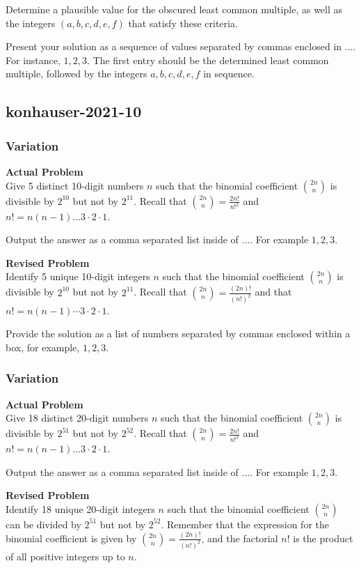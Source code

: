 Determine a plausible value for the obscured least common multiple, as well as the integers $(a, b, c, d, e, f)$ that satisfy these criteria.

Present your solution as a sequence of values separated by commas enclosed in $\boxed{...}$. For instance, $\boxed{1, 2, 3}$. The first entry should be the determined least common multiple, followed by the integers $a, b, c, d, e, f$ in sequence.

\subsection{konhauser-2021-10}
\subsubsection{Variation}
\textbf{Actual Problem}\\
Give 5 distinct 10-digit numbers $n$ such that the binomial coefficient $\binom{2n}{n}$ is divisible by $2^{10}$ but not by $2^{11}$. Recall that $\binom{2n}{n} = \frac{2n!}{n!^2}$ and $n! = n(n-1)...3\cdot 2 \cdot 1$.

Output the answer as a comma separated list inside of $\boxed{...}$. For example $\boxed{1, 2, 3}$.

\textbf{Revised Problem}\\
Identify 5 unique 10-digit integers \( n \) such that the binomial coefficient \(\binom{2n}{n}\) is divisible by \( 2^{10} \) but not by \( 2^{11} \). Recall that \(\binom{2n}{n} = \frac{(2n)!}{(n!)^2}\) and that \( n! = n(n-1)\cdots 3 \cdot 2 \cdot 1\).

Provide the solution as a list of numbers separated by commas enclosed within a box, for example, \(\boxed{1, 2, 3}\).

\subsubsection{Variation}
\textbf{Actual Problem}\\
Give 18 distinct 20-digit numbers $n$ such that the binomial coefficient $\binom{2n}{n}$ is divisible by $2^{51}$ but not by $2^{52}$. Recall that $\binom{2n}{n} = \frac{2n!}{n!^2}$ and $n! = n(n-1)...3\cdot 2 \cdot 1$.

Output the answer as a comma separated list inside of $\boxed{...}$. For example $\boxed{1, 2, 3}$.

\textbf{Revised Problem}\\
Identify 18 unique 20-digit integers \( n \) such that the binomial coefficient \( \binom{2n}{n} \) can be divided by \( 2^{51} \) but not by \( 2^{52} \). Remember that the expression for the binomial coefficient is given by \( \binom{2n}{n} = \frac{(2n)!}{(n!)^2} \), and the factorial \( n! \) is the product of all positive integers up to \( n \).

